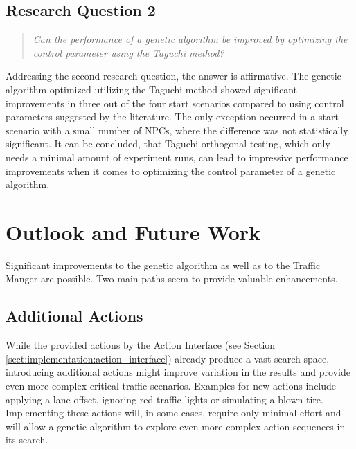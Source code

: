 \subsection{Research Question 2}
\begin{quote}
	\begin{em}
		\textit{Can the performance of a genetic algorithm be improved by optimizing the control parameter using the Taguchi method?}
	\end{em}
\end{quote}

Addressing the second research question, the answer is affirmative. The genetic algorithm optimized utilizing the Taguchi method showed significant improvements in three out of the four start scenarios compared to using control parameters suggested by the literature. The only exception occurred in a start scenario with a small number of NPCs, where the difference was not statistically significant. It can be concluded, that Taguchi orthogonal testing, which only needs a minimal amount of experiment runs, can lead to impressive performance improvements when it comes to optimizing the control parameter of a genetic algorithm.

\section{Outlook and Future Work}
Significant improvements to the genetic algorithm as well as to the Traffic Manger are possible. Two main paths seem to provide valuable enhancements.

\subsection{Additional Actions}
While the provided actions by the Action Interface (see Section \ref{sect:implementation:action_interface}) already produce a vast search space, introducing additional actions might improve variation in the results and provide even more complex critical traffic scenarios. Examples for new actions include applying a lane offset, ignoring red traffic lights or simulating a blown tire. Implementing these actions will, in some cases, require only minimal effort and will allow a genetic algorithm to explore even more complex action sequences in its search.

